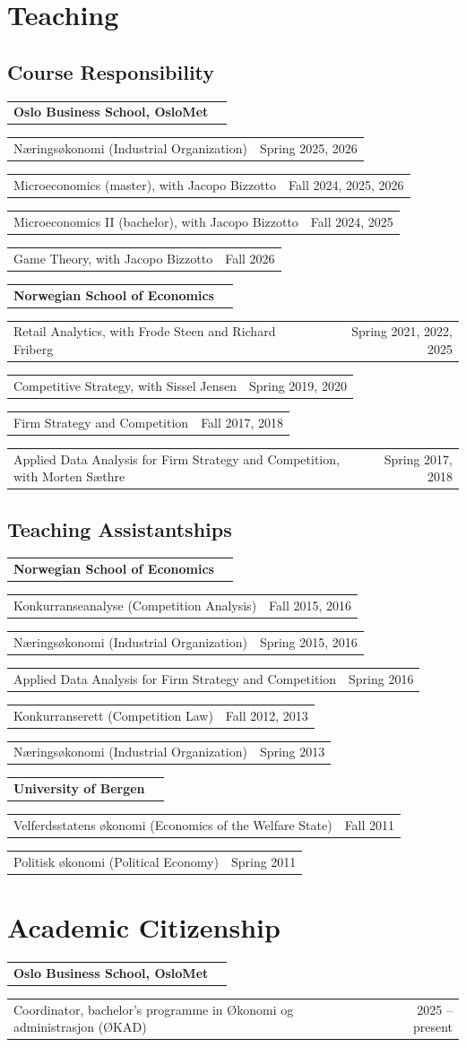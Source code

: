 \documentclass[10pt,a4paper]{article}
\makeatletter
\newcommand{\org}[2]{%
  \vspace{0.42em}%
  \begin{tabularx}{\linewidth}{@{}Xr@{}}
    \textbf{#1} & \textsc{\small #2}
  \end{tabularx}\par\vspace{0.15em}}
\newcommand{\role}[2]{%
  \hspace*{1.1em}%
  \begin{tabularx}{\dimexpr\linewidth-1.1em}{@{}Xr@{}}
    #1 & {\small #2}
  \end{tabularx}\par\vspace{0.1em}}
\makeatother
\begin{document}
\section{Teaching}

\subsection*{Course Responsibility}

\org{Oslo Business School, OsloMet}{}
\role{Næringsøkonomi (Industrial Organization)}{Spring 2025, 2026}
\role{Microeconomics (master), with Jacopo Bizzotto}{Fall 2024, 2025, 2026}
\role{Microeconomics II (bachelor), with Jacopo Bizzotto}{Fall 2024, 2025}
\role{Game Theory, with Jacopo Bizzotto}{Fall 2026}

\org{Norwegian School of Economics}{}
\role{Retail Analytics, with Frode Steen and Richard Friberg}{Spring 2021, 2022, 2025}
\role{Competitive Strategy, with Sissel Jensen}{Spring 2019, 2020}
\role{Firm Strategy and Competition}{Fall 2017, 2018}
\role{Applied Data Analysis for Firm Strategy and Competition,
      with Morten Sæthre}{Spring 2017, 2018}

\subsection*{Teaching Assistantships}

\org{Norwegian School of Economics}{}
\role{Konkurranseanalyse (Competition Analysis)}{Fall 2015, 2016}
\role{Næringsøkonomi (Industrial Organization)}{Spring 2015, 2016}
\role{Applied Data Analysis for Firm Strategy and Competition}{Spring 2016}
\role{Konkurranserett (Competition Law)}{Fall 2012, 2013}
\role{Næringsøkonomi (Industrial Organization)}{Spring 2013}

\org{University of Bergen}{}
\role{Velferdsstatens økonomi (Economics of the Welfare State)}{Fall 2011}
\role{Politisk økonomi (Political Economy)}{Spring 2011}

\section{Academic Citizenship}

\org{Oslo Business School, OsloMet}{}
\role{Coordinator, bachelor's programme in Økonomi og administrasjon
      (ØKAD)}{2025 -- present}
\end{document}
